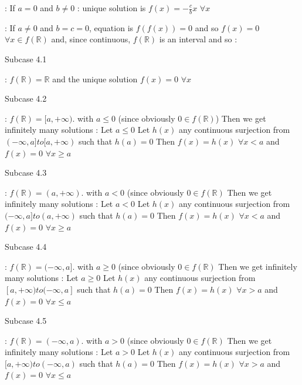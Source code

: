 \begin{solution}
: If $a=0$ and $b\ne 0$ : unique solution is $f(x)=-\frac cbx$ $\forall x$

 : If $a\ne 0$ and $b=c=0$, equation is $f(f(x))=0$ and so $f(x)=0$ $\forall x\in f(\mathbb R)$ and, since continuous, $f(\mathbb R)$ is an interval and so : 

\begin{bolded}Subcase 4.1\end{bolded} : $f(\mathbb R)=\mathbb R$ and the unique solution $f(x)=0$ $\forall x$

\begin{bolded}Subcase 4.2\end{bolded} : $f(\mathbb R)=[a,+\infty)$. with $a\le 0$ (since obviously $0\in f(\mathbb R)$)
Then we get infinitely many solutions :
Let $a\le 0$
Let $h(x)$ any continuous surjection from $(-\infty,a]to[a,+\infty)$ such that $h(a)=0$
Then $f(x)=h(x)$ $\forall x<a$ and $f(x)=0$ $\forall x\ge a$

\begin{bolded}Subcase 4.3\end{bolded} : $f(\mathbb R)=(a,+\infty)$. with $a< 0$ (since obviously $0\in f(\mathbb R)$
Then we get infinitely many solutions :
Let $a<0$
Let $h(x)$ any continuous surjection from $(-\infty,a]to(a,+\infty)$ such that $h(a)=0$
Then $f(x)=h(x)$ $\forall x<a$ and $f(x)=0$ $\forall x\ge a$

\begin{bolded}Subcase 4.4 \end{bolded}: $f(\mathbb R)=(-\infty,a]$. with $a\ge 0$ (since obviously $0\in f(\mathbb R)$
Then we get infinitely many solutions :
Let $a\ge 0$
Let $h(x)$ any continuous surjection from $[a,+\infty)to(-\infty,a]$ such that $h(a)=0$
Then $f(x)=h(x)$ $\forall x>a$ and $f(x)=0$ $\forall x\le a$

\begin{bolded}Subcase 4.5\end{bolded} : $f(\mathbb R)=(-\infty,a)$. with $a>0$ (since obviously $0\in f(\mathbb R)$
Then we get infinitely many solutions :
Let $a>0$
Let $h(x)$ any continuous surjection from $[a,+\infty)to(-\infty,a)$ such that $h(a)=0$
Then $f(x)=h(x)$ $\forall x>a$ and $f(x)=0$ $\forall x\le a$


\end{solution}
